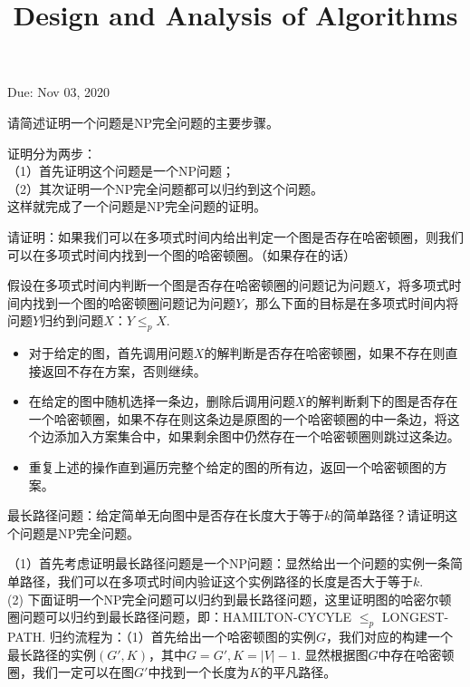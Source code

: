 \documentclass{myhw}
\title{Design and Analysis of Algorithms}
\begin{document}
\begin{center}

\vspace{0.5cm}

Due: Nov 03, 2020

\vspace{0.5cm}
\end{center}
\begin{homeworkProblem}
请简述证明一个问题是NP完全问题的主要步骤。
\end{homeworkProblem}
\begin{solution}
证明分为两步：\\
（1）首先证明这个问题是一个NP问题；\\
（2）其次证明一个NP完全问题都可以归约到这个问题。\\
这样就完成了一个问题是NP完全问题的证明。
\end{solution}
\begin{homeworkProblem}
请证明：如果我们可以在多项式时间内给出判定一个图是否存在哈密顿圈，则我们可以在多项式时间内找到一个图的哈密顿圈。（如果存在的话）
\end{homeworkProblem}

\begin{solution}
假设在多项式时间内判断一个图是否存在哈密顿圈的问题记为问题$X$，将多项式时间内找到一个图的哈密顿圈问题记为问题$Y$，那么下面的目标是在多项式时间内将问题$Y$归约到问题$X$：$Y\leq_p X$.
\begin{itemize}
\item 对于给定的图，首先调用问题$X$的解判断是否存在哈密顿圈，如果不存在则直接返回不存在方案，否则继续。
\item 在给定的图中随机选择一条边，删除后调用问题$X$的解判断剩下的图是否存在一个哈密顿圈，如果不存在则这条边是原图的一个哈密顿圈的中一条边，将这个边添加入方案集合中，如果剩余图中仍然存在一个哈密顿圈则跳过这条边。
\item 重复上述的操作直到遍历完整个给定的图的所有边，返回一个哈密顿图的方案。
\end{itemize}

\end{solution}
\begin{homeworkProblem}
最长路径问题：给定简单无向图中是否存在长度大于等于$k$的简单路径？请证明这个问题是NP完全问题。
\end{homeworkProblem}

\begin{solution}
（1）首先考虑证明最长路径问题是一个NP问题：显然给出一个问题的实例一条简单路径，我们可以在多项式时间内验证这个实例路径的长度是否大于等于$k$. \\
(2) 下面证明一个NP完全问题可以归约到最长路径问题，这里证明图的哈密尔顿圈问题可以归约到最长路径问题，即：HAMILTON-CYCYLE $\leq_p$ LONGEST-PATH. 归约流程为：（1）首先给出一个哈密顿图的实例$G$，我们对应的构建一个最长路径的实例$(G',K)$，其中$G=G', K=|V|-1$. 显然根据图$G$中存在哈密顿圈，我们一定可以在图$G'$中找到一个长度为$K$的平凡路径。
\end{solution}
\end{document}
